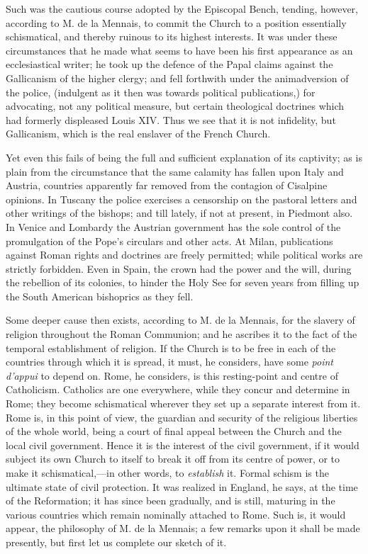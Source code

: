 Such was the cautious course adopted by the
Episcopal Bench, tending, however, according to M. de la Mennais, to
commit the Church to a position essentially schismatical, and thereby
ruinous to its highest interests. It was under these circumstances
that he made what seems to have been his first appearance as an
ecclesiastical writer; he took up the defence of the Papal claims
against the Gallicanism of the higher clergy; and fell forthwith under
the animadversion of the police, (indulgent as it then was towards
political publications,) for advocating, not any political measure,
but certain theological doctrines which had formerly displeased Louis XIV. Thus we see that it is not infidelity, but Gallicanism,
which is the real enslaver of the French Church.

Yet even this fails of being the full and
sufficient explanation of its captivity; as is plain from the
circumstance that the same calamity has fallen upon Italy and Austria,
countries apparently far removed from the contagion of Cisalpine
opinions. In Tuscany the police exercises a censorship on the pastoral
letters and other writings of the bishops; and till lately, if not at
present, in Piedmont also. In Venice and Lombardy the Austrian
government has the sole control of the promulgation of the Pope's
circulars and other acts. At Milan, publications against Roman rights
and doctrines are freely permitted; while political works are strictly
forbidden. Even in Spain, the crown had the power and the will, during
the rebellion of its colonies, to hinder the Holy See for seven years
from filling up the South American bishoprics as they fell.

Some deeper cause then exists, according to M. de
la Mennais, for the slavery of religion throughout the Roman
Communion; and he ascribes it to the fact of the temporal
establishment of religion. If the Church is to be free in each of the
countries through which it is spread, it must, he considers, have some
\emph{point d'appui} to depend on. Rome, he considers, is this
resting-point and centre of Catholicism. Catholics are one everywhere,
while they concur and determine in Rome; they become schismatical
wherever they set up a separate interest from it. Rome is, in this
point of view, the guardian and security of the religious liberties of
the whole world, being a court of final appeal between the Church and
the local civil government. Hence it is the interest of the civil
government, if it would subject its own Church to itself to break it
off from its centre of power, or to make it schismatical,—in
other words, to \emph{establish} it. Formal schism is the ultimate
state of civil protection. It was realized in England, he says, at the
time of the Reformation; it has since been gradually, and is still,
maturing in the various countries which remain nominally attached to
Rome. Such is, it would appear, the philosophy of M. de la Mennais; a
few remarks upon it shall be made presently, but first let us complete
our sketch of it.

